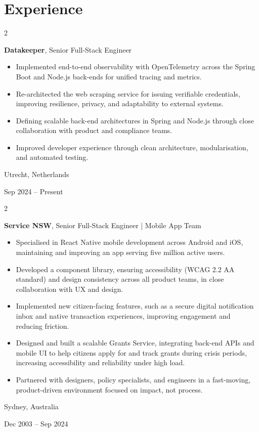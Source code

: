 \documentclass[10pt, a4paper]{article}
\newenvironment{highlights}{
    \begin{itemize}[
        topsep=0.10 cm,
        parsep=0.10 cm,
        partopsep=0pt,
        itemsep=0pt,
        leftmargin=0.4 cm + 10pt
    ]
}{
    \end{itemize}
} %
\newenvironment{twocolentry}[2][]{
    \onecolentry
    \def\secondColumn{#2}
    \setcolumnwidth{\fill, 4.5 cm}
    \begin{paracol}{2}
}{
    \switchcolumn \raggedleft \secondColumn
    \end{paracol}
    \endonecolentry
} %
\begin{document}
    \section{Experience}

        \begin{twocolentry}{
            Utrecht, Netherlands
        
            Sep 2024 – Present
        }
            \textbf{Datakeeper}, Senior Full-Stack Engineer
            \begin{highlights}
                \item Implemented end-to-end observability with OpenTelemetry across the Spring Boot and Node.js back-ends for unified tracing and metrics.
                \item Re-architected the web scraping service for issuing verifiable credentials, improving resilience, privacy, and adaptability to external systems.
                \item Defining scalable back-end architectures in Spring and Node.js through close collaboration with product and compliance teams.
                \item Improved developer experience through clean architecture, modularisation, and automated testing.
            \end{highlights}
        \end{twocolentry}

        \vspace{0.2 cm}

        \begin{twocolentry}{
            Sydney, Australia

        Dec 2003 – Sep 2024
        }
            \textbf{Service NSW}, Senior Full-Stack Engineer | Mobile App Team
            \begin{highlights}
                \item Specialised in React Native mobile development across Android and iOS, maintaining and improving an app serving five million active users.
                \item Developed a component library, ensuring accessibility (WCAG 2.2 AA standard) and design consistency across all product teams, in close collaboration with UX and design.
                \item Implemented new citizen-facing features, such as a secure digital notification inbox and native transaction experiences, improving engagement and reducing friction.
                \item Designed and built a scalable Grants Service, integrating back-end APIs and mobile UI to help citizens apply for and track grants during crisis periods, increasing accessibility and reliability under high load.
                \item Partnered with designers, policy specialists, and engineers in a fast-moving, product-driven environment focused on impact, not process.
            \end{highlights}
        \end{twocolentry}
\end{document}
